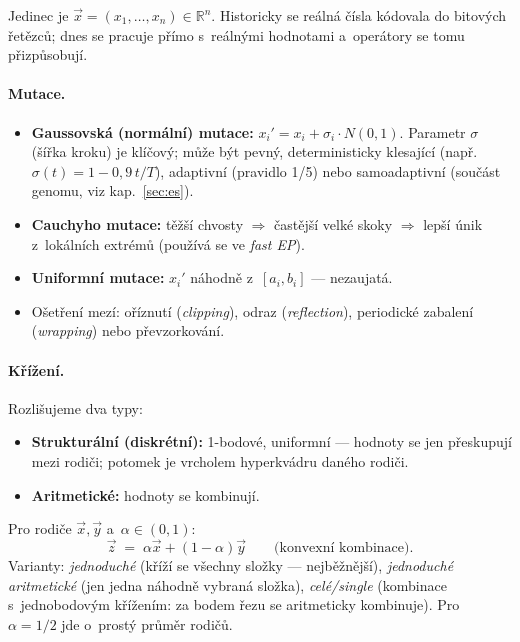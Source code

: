 \documentclass[11pt,a4paper]{article}
\theoremstyle{definition}
\begin{document}
Jedinec je $\vec{x} = (x_1,\dots,x_n) \in \mathbb{R}^n$. Historicky se reálná
čísla kódovala do bitových řetězců; dnes se pracuje přímo s~reálnými hodnotami
a~operátory se tomu přizpůsobují.

\paragraph{Mutace.}
\begin{itemize}
\item \textbf{Gaussovská (normální) mutace:}
  $x_i' = x_i + \sigma_i \cdot N(0,1)$. Parametr $\sigma$ (šířka kroku) je
  klíčový; může být pevný, deterministicky klesající
  (např.\ $\sigma(t) = 1 - 0{,}9\,t/T$), adaptivní (pravidlo 1/5) nebo
  samoadaptivní (součást genomu, viz kap.~\ref{sec:es}).
\item \textbf{Cauchyho mutace:} těžší chvosty $\Rightarrow$ častější velké skoky
  $\Rightarrow$ lepší únik z~lokálních extrémů (používá se ve \emph{fast EP}).
\item \textbf{Uniformní mutace:} $x_i'$ náhodně z~$[a_i, b_i]$ --- nezaujatá.
\item Ošetření mezí: oříznutí (\emph{clipping}), odraz (\emph{reflection}),
  periodické zabalení (\emph{wrapping}) nebo převzorkování.
\end{itemize}

\paragraph{Křížení.} Rozlišujeme dva typy:
\begin{itemize}
\item \textbf{Strukturální (diskrétní):} 1-bodové, uniformní --- hodnoty se jen
  přeskupují mezi rodiči; potomek je vrcholem hyperkvádru daného rodiči.
\item \textbf{Aritmetické:} hodnoty se kombinují.
\end{itemize}

\begin{defbox}
Pro rodiče $\vec x, \vec y$ a~$\alpha \in (0,1)$:
\[
\vec z \;=\; \alpha \vec x + (1-\alpha)\vec y \qquad\text{(konvexní kombinace)}.
\]
Varianty: \emph{jednoduché} (kříží se všechny složky --- nejběžnější),
\emph{jednoduché aritmetické} (jen jedna náhodně vybraná složka),
\emph{celé/single} (kombinace s~jednobodovým křížením: za bodem řezu se
aritmeticky kombinuje). Pro $\alpha = 1/2$ jde o~prostý průměr rodičů.
\end{defbox}
\end{document}
